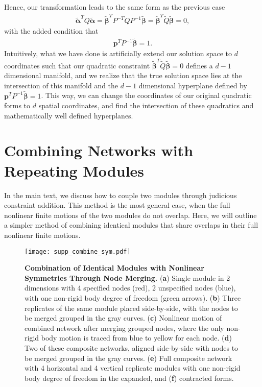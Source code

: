 \documentclass[%
preprint,
 amsmath,amssymb,
 aps,
]{revtex4-1}
\begin{document}
Hence, our transformation leads to the same form as the previous case
\begin{align*}
\bm{\tilde{\alpha}}^T Q \bm{\tilde{\alpha}} = \bm{\tilde{\beta}}^T P^{-T} Q P^{-1} \bm{\tilde{\beta}} = \bm{\tilde{\beta}}^T \tilde{Q}\bm{\tilde{\beta}} = 0,
\end{align*}
with the added condition that
\begin{align*}
\bm{p}^T P^{-1}\bm{\tilde{\beta}} = 1.
\end{align*}
Intuitively, what we have done is artificially extend our solution space to $d$ coordinates such that our quadratic constraint $\bm{\tilde{\beta}}^T \tilde{Q} \bm{\tilde{\beta}} = 0$ defines a $d - 1$ dimensional manifold, and we realize that the true solution space lies at the intersection of this manifold and the $d-1$ dimensional hyperplane defined by $\bm{p}^T P^{-1} \bm{\tilde{\beta}} = 1$. This way, we can change the coordinates of our original quadratic forms to $d$ spatial coordinates, and find the intersection of these quadratics and mathematically well defined hyperplanes. 



\section{Combining Networks with Repeating Modules}
In the main text, we discuss how to couple two modules through judicious constraint addition. This method is the most general case, when the full nonlinear finite motions of the two modules do not overlap. Here, we will outline a simpler method of combining identical modules that share overlaps in their full nonlinear finite motions.

\begin{figure}[h!]
	\centering
	\texttt{[image: supp\_combine\_sym.pdf]}
	\caption{\textbf{Combination of Identical Modules with Nonlinear Symmetries Through Node Merging.} (\textbf{a}) Single module in 2 dimensions with 4 specified nodes (red), 2 unspecified nodes (blue), with one non-rigid body degree of freedom (green arrows). (\textbf{b}) Three replicates of the same module placed side-by-side, with the nodes to be merged grouped in the gray curves. (\textbf{c}) Nonlinear motion of combined network after merging grouped nodes, where the only non-rigid body motion is traced from blue to yellow for each node. (\textbf{d}) Two of these composite networks, aligned side-by-side with nodes to be merged grouped in the gray curves. (\textbf{e}) Full composite network with 4 horizontal and 4 vertical replicate modules with one non-rigid body degree of freedom in the expanded, and (\textbf{f}) contracted forms.}
	\label{fig:supp_combine_sym}
\end{figure}
\end{document}
